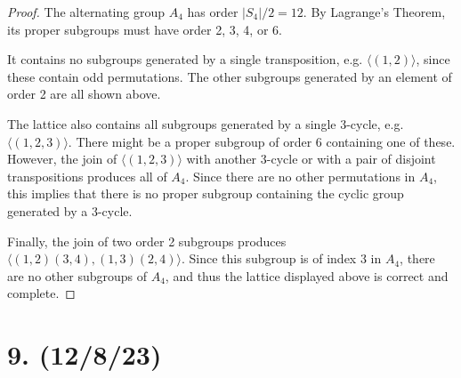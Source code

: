 \documentclass{article}
\begin{document}

\begin{proof}
    The alternating group $A_4$ has order $|S_4|/2 = 12$. By Lagrange's Theorem, its proper subgroups must have order 2, 3, 4, or 6.

    It contains no subgroups generated by a single transposition, e.g. $\langle (1, 2) \rangle$, since these contain odd permutations. The other subgroups generated by an element of order 2 are all shown above.

    The lattice also contains all subgroups generated by a single 3-cycle, e.g. $\langle (1, 2, 3) \rangle$. There might be a proper subgroup of order 6 containing one of these. However, the join of $\langle (1, 2, 3) \rangle$ with another 3-cycle or with a pair of disjoint transpositions produces all of $A_4$. Since there are no other permutations in $A_4$, this implies that there is no proper subgroup containing the cyclic group generated by a 3-cycle.

    Finally, the join of two order 2 subgroups produces $\langle (1, 2)(3, 4), (1, 3)(2, 4) \rangle$. Since this subgroup is of index 3 in $A_4$, there are no other subgroups of $A_4$, and thus the lattice displayed above is correct and complete.
\end{proof}

\section*{9. (12/8/23)}
\end{document}
